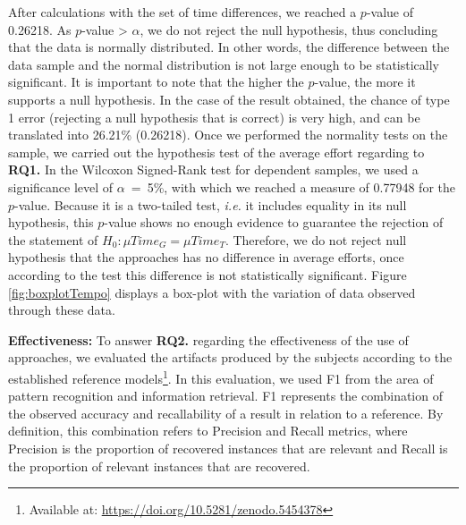 After calculations with the set of time differences, we reached a $p$-value of 0.26218.
As $p$-value > $\alpha$, we do not reject the null hypothesis, thus concluding that the data is normally distributed.
In other words, the difference between the data sample and the normal distribution is not large enough to be statistically significant.
It is important to note that the higher the $p$-value, the more it supports a null hypothesis.
In the case of the result obtained, the chance of type 1 error (rejecting a null hypothesis that is correct) is very high, and can be translated into 26.21\% (0.26218).
Once we performed the normality tests on the sample, we carried out the hypothesis test of the average effort regarding to \textbf{RQ1.}
In the Wilcoxon Signed-Rank test for dependent samples, we used a significance level of $\alpha$~=~5\%, with which we reached a measure of 0.77948 for the $p$-value.
Because it is a two-tailed test, \textit{i.e.} it includes equality in its null hypothesis, this $p$-value shows no enough evidence to guarantee the rejection of the statement of $H_0: \mu Time_G = \mu Time_T$.
Therefore, we do not reject null hypothesis that the approaches has no difference in average efforts, once according to the test this difference is not statistically significant. 
Figure \ref{fig:boxplotTempo} displays a box-plot with the variation of data observed through these data.

%     

\textbf{Effectiveness:} To answer \textbf{RQ2.} regarding the effectiveness of the use of approaches, we evaluated the artifacts produced by the subjects according to the established reference models\footnote{Available at: \url{https://doi.org/10.5281/zenodo.5454378}}. 
In this evaluation, we used F1 from the area of pattern recognition and information retrieval. 
F1 represents the combination of the observed accuracy and recallability of a result in relation to a reference.
By definition, this combination refers to Precision and Recall metrics, where Precision is the proportion of recovered instances that are relevant and Recall is the proportion of relevant instances that are recovered.

